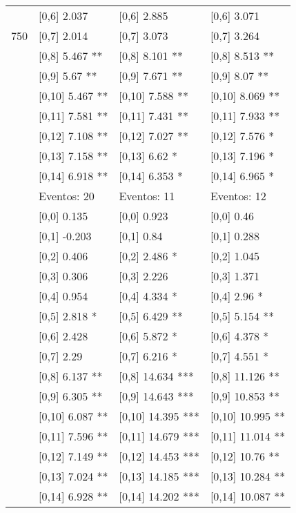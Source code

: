 \begin{table}
\begin{tabular}[t]{llll}
 & {}[0,6] 2.037 & {}[0,6] 2.885 & {}[0,6] 3.071\\
750 & {}[0,7] 2.014 & {}[0,7] 3.073 & {}[0,7] 3.264\\
\addlinespace
 & {}[0,8] 5.467 ** & {}[0,8] 8.101 ** & {}[0,8] 8.513 **\\
 & {}[0,9] 5.67 ** & {}[0,9] 7.671 ** & {}[0,9] 8.07 **\\
 & {}[0,10] 5.467 ** & {}[0,10] 7.588 ** & {}[0,10] 8.069 **\\
 & {}[0,11] 7.581 ** & {}[0,11] 7.431 ** & {}[0,11] 7.933 **\\
 & {}[0,12] 7.108 ** & {}[0,12] 7.027 ** & {}[0,12] 7.576 *\\
\addlinespace
 & {}[0,13] 7.158 ** & {}[0,13] 6.62 * & {}[0,13] 7.196 *\\
 & {}[0,14] 6.918 ** & {}[0,14] 6.353 * & {}[0,14] 6.965 *\\
 & Eventos:  20 & Eventos:  11 & Eventos:  12\\
 & {}[0,0] 0.135 & {}[0,0] 0.923 & {}[0,0] 0.46\\
 & {}[0,1] -0.203 & {}[0,1] 0.84 & {}[0,1] 0.288\\
\addlinespace
 & {}[0,2] 0.406 & {}[0,2] 2.486 * & {}[0,2] 1.045\\
 & {}[0,3] 0.306 & {}[0,3] 2.226 & {}[0,3] 1.371\\
 & {}[0,4] 0.954 & {}[0,4] 4.334 * & {}[0,4] 2.96 *\\
 & {}[0,5] 2.818 * & {}[0,5] 6.429 ** & {}[0,5] 5.154 **\\
 & {}[0,6] 2.428 & {}[0,6] 5.872 * & {}[0,6] 4.378 *\\
\addlinespace
1000 & {}[0,7] 2.29 & {}[0,7] 6.216 * & {}[0,7] 4.551 *\\
 & {}[0,8] 6.137 ** & {}[0,8] 14.634 *** & {}[0,8] 11.126 **\\
 & {}[0,9] 6.305 ** & {}[0,9] 14.643 *** & {}[0,9] 10.853 **\\
 & {}[0,10] 6.087 ** & {}[0,10] 14.395 *** & {}[0,10] 10.995 **\\
 & {}[0,11] 7.596 ** & {}[0,11] 14.679 *** & {}[0,11] 11.014 **\\
\addlinespace
 & {}[0,12] 7.149 ** & {}[0,12] 14.453 *** & {}[0,12] 10.76 **\\
 & {}[0,13] 7.024 ** & {}[0,13] 14.185 *** & {}[0,13] 10.284 **\\
 & {}[0,14] 6.928 ** & {}[0,14] 14.202 *** & {}[0,14] 10.087 **\\
\bottomrule
\end{tabular}
\end{table}
